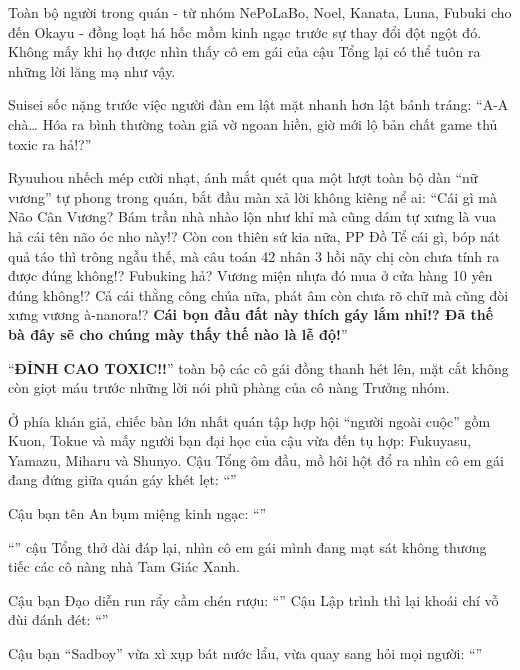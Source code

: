 \documentclass[../main.tex]{subfiles}
\begin{document}
Toàn bộ người trong quán - từ nhóm NePoLaBo, Noel, Kanata, Luna, Fubuki cho đến Okayu - đồng loạt há hốc mồm kinh ngạc trước sự thay đổi đột ngột đó. Không mấy khi họ được nhìn thấy cô em gái của cậu Tổng lại có thể tuôn ra những lời lăng mạ như vậy.

Suisei sốc nặng trước việc người đàn em lật mặt nhanh hơn lật bánh tráng: ``A-A chà\dots{} Hóa ra bình thường toàn giả vờ ngoan hiền, giờ mới lộ bản chất game thủ toxic ra hả!?''

Ryuuhou nhếch mép cười nhạt, ánh mắt quét qua một lượt toàn bộ dàn ``nữ vương'' tự phong trong quán, bắt đầu màn xả lời không kiêng nể ai: ``Cái gì mà Não Cân Vương? Bám trần nhà nhào lộn như khỉ mà cũng dám tự xưng là vua hả cái tên não óc nho này!? Còn con thiên sứ kia nữa, PP Đồ Tể cái gì, bóp nát quả táo thì trông ngầu thế, mà câu toán 42 nhân 3 hồi nãy chị còn chưa tính ra được đúng không!? Fubuking hả? Vương miện nhựa đó mua ở cửa hàng 10 yên đúng không!? Cả cái thằng công chúa nữa, phát âm còn chưa rõ chữ mà cũng đòi xưng vương à-nanora!? \textbf{Cái bọn đầu đất này thích gáy lắm nhỉ!? Đã thế bà đây sẽ cho chúng mày thấy thế nào là lễ độ!}''

``\textbf{ĐỈNH CAO TOXIC!!}'' toàn bộ các cô gái đồng thanh hét lên, mặt cắt không còn giọt máu trước những lời nói phũ phàng của cô nàng Trưởng nhóm.

Ở phía khán giả, chiếc bàn lớn nhất quán tập hợp hội ``người ngoài cuộc'' gồm Kuon, Tokue và mấy người bạn đại học của cậu vừa đến tụ hợp: Fukuyasu, Yamazu, Miharu và Shunyo. Cậu Tổng ôm đầu, mồ hôi hột đổ ra nhìn cô em gái đang đứng giữa quán gáy khét lẹt: ``''

Cậu bạn tên An bụm miệng kinh ngạc: ``''

``'' cậu Tổng thở dài đáp lại, nhìn cô em gái mình đang mạt sát không thương tiếc các cô nàng nhà Tam Giác Xanh.

Cậu bạn Đạo diễn run rẩy cầm chén rượu: ``'' Cậu Lập trình thì lại khoái chí vỗ đùi đánh đét: ``''

Cậu bạn ``Sadboy'' vừa xì xụp bát nước lẩu, vừa quay sang hỏi mọi người: ``''
\end{document}
